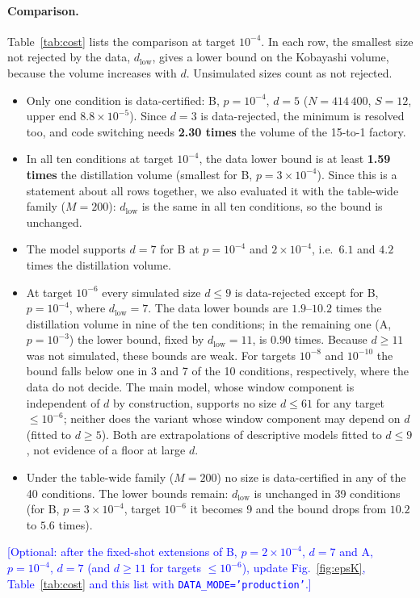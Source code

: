 \documentclass[a4paper]{article}
\newcommand{\blue}[1]{\textcolor{blue}{#1}}
\begin{document}
\paragraph{Comparison.}
Table~\ref{tab:cost} lists the comparison at target $10^{-4}$. In each row, the smallest size not rejected by the data, $d_{\mathrm{low}}$, gives a lower bound on the Kobayashi volume, because the volume increases with $d$. Unsimulated sizes count as not rejected.
\begin{itemize}[leftmargin=*,itemsep=0pt]
\item Only one condition is data-certified: B, $p=10^{-4}$, $d=5$ ($N=414\,400$, $S=12$, upper end $8.8\times10^{-5}$). Since $d=3$ is data-rejected, the minimum is resolved too, and code switching needs \textbf{2.30 times} the volume of the 15-to-1 factory.
\item In all ten conditions at target $10^{-4}$, the data lower bound is at least \textbf{1.59 times} the distillation volume (smallest for B, $p=3\times10^{-4}$). Since this is a statement about all rows together, we also evaluated it with the table-wide family ($M=200$): $d_{\mathrm{low}}$ is the same in all ten conditions, so the bound is unchanged.
\item The model supports $d=7$ for B at $p=10^{-4}$ and $2\times10^{-4}$, i.e.\ $6.1$ and $4.2$ times the distillation volume.
\item At target $10^{-6}$ every simulated size $d\le9$ is data-rejected except for B, $p=10^{-4}$, where $d_{\mathrm{low}}=7$. The data lower bounds are $1.9$--$10.2$ times the distillation volume in nine of the ten conditions; in the remaining one (A, $p=10^{-3}$) the lower bound, fixed by $d_{\mathrm{low}}=11$, is $0.90$ times. Because $d\ge11$ was not simulated, these bounds are weak. For targets $10^{-8}$ and $10^{-10}$ the bound falls below one in 3 and 7 of the 10 conditions, respectively, where the data do not decide. The main model, whose window component is independent of $d$ by construction, supports no size $d\le61$ for any target $\le10^{-6}$; neither does the variant whose window component may depend on $d$ (fitted to $d\ge5$). Both are extrapolations of descriptive models fitted to $d\le9$, not evidence of a floor at large $d$.
\item Under the table-wide family ($M=200$) no size is data-certified in any of the 40 conditions. The lower bounds remain: $d_{\mathrm{low}}$ is unchanged in 39 conditions (for B, $p=3\times10^{-4}$, target $10^{-6}$ it becomes 9 and the bound drops from $10.2$ to $5.6$ times).
\end{itemize}
\blue{[Optional: after the fixed-shot extensions of B, $p=2\times10^{-4}$, $d=7$ and A, $p=10^{-4}$, $d=7$ (and $d\ge11$ for targets $\le10^{-6}$), update Fig.~\ref{fig:epsK}, Table~\ref{tab:cost} and this list with \texttt{DATA\_MODE='production'}.]}
\end{document}
